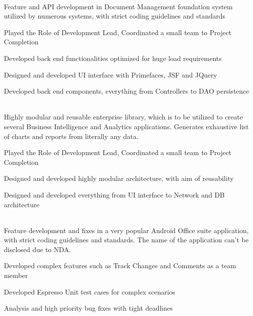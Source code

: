 \documentclass[]{deedy-resume-openfont}
\begin{document}
\hfill {}\\
Feature and API development in Document Management foundation system utilized by numerous systems, with strict coding guidelines and standards\\
\begin{tightemize}
	\item Played the Role of Development Lead, Coordinated a small team to Project Completion
	\item Developed back end functionalities optimized for huge load requirements
	\item Designed and developed UI interface with Primefaces, JSF and JQuery
	\item Developed back end components, everything from Controllers to DAO persistence
\end{tightemize}
\sectionsep
  
\clearpage
{}
\hfill {}\\
Highly modular and reusable enterprise library, which is to be utilized to create several Business Intelligence and Analytics applications. Generates exhaustive list of charts and reports from literally any data.\\
\begin{tightemize}
	\item Played the Role of Development Lead, Coordinated a small team to Project Completion
	\item Designed and developed highly modular architecture, with aim of reusability
	\item Designed and developed everything from UI interface to Network and DB architecture
\end{tightemize}
\sectionsep
  

\\
Feature development and fixes in a very popular Android Office suite application, with strict coding guidelines and standards. The name of the application can’t be disclosed due to NDA.\\
\begin{tightemize}
	\item Developed complex features such as Track Changes and Comments as a team member
	\item Developed Espresso Unit test cases for complex scenarios
	\item Analysis and high priority bug fixes with tight deadlines
\end{tightemize}
\sectionsep
%
%
\end{document}
